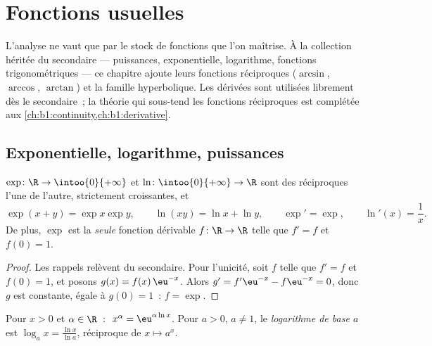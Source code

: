 \chapter{Fonctions usuelles}\label{ch:b1:functions}

L'analyse ne vaut que par le stock de fonctions que l'on maîtrise. À
la collection héritée du secondaire --- puissances, exponentielle,
logarithme, fonctions trigonométriques --- ce chapitre ajoute leurs
fonctions réciproques ($\arcsin$, $\arccos$, $\arctan$) et la famille
hyperbolique. Les dérivées sont utilisées librement dès le
secondaire~; la théorie qui sous-tend les fonctions réciproques est
complétée aux \cref{ch:b1:continuity,ch:b1:derivative}.

\section{Exponentielle, logarithme, puissances}

\begin{proposition}\label{prop:b1:functions:expln}
$\exp \colon \R \to \intoo{0}{+\infty}$ et $\ln \colon
\intoo{0}{+\infty} \to \R$ sont des  réciproques l'une de
l'autre, strictement croissantes, et
\[
\exp(x + y) = \exp x \exp y, \qquad \ln(xy) = \ln x + \ln y,
\qquad \exp' = \exp, \qquad \ln'(x) = \frac 1x .
\]
De plus, $\exp$ est la \emph{seule} fonction dérivable $f \colon
\R \to \R$ telle que $f' = f$ et $f(0) = 1$.
\end{proposition}

\begin{proof}
Les rappels relèvent du secondaire. Pour l'unicité, soit $f$ telle que
$f' = f$ et $f(0) = 1$, et posons $g(x) = f(x)\,\eu^{-x}$. Alors
$g' = f'\eu^{-x} - f\eu^{-x} = 0$, donc $g$ est constante, égale à
$g(0) = 1$~: $f = \exp$.
\end{proof}

\begin{definition}\label{def:b1:functions:powers}
Pour $x > 0$ et $\alpha \in \R$~:
$\;x^\alpha = \eu^{\alpha \ln x}$. Pour
$a > 0$, $a \neq 1$, le \emph{logarithme de base $a$} est $\log_a x =
\frac{\ln x}{\ln a}$, réciproque de $x \mapsto a^x$.
\end{definition}

